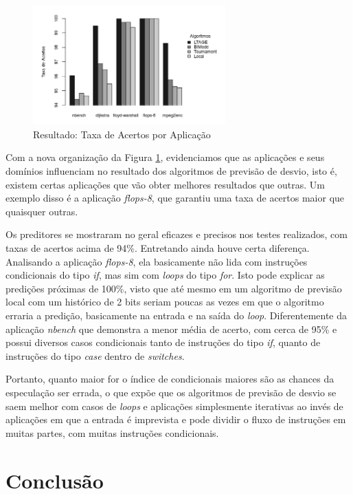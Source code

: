 \documentclass[12pt]{article}
\begin{document}
\begin{figure}[H]
\centering
\includegraphics[width=0.66\textwidth]{appTax.jpeg}
\caption{Resultado: Taxa de Acertos por Aplicação}
\label{fig:appTax}
\end{figure}

Com a nova organização da Figura \ref{fig:appTax}, evidenciamos que as aplicações e seus domínios influenciam no resultado dos algoritmos
de previsão de desvio, isto é, existem certas aplicações que vão obter melhores resultados que outras. Um exemplo disso é 
a aplicação \textit{flops-8}, que garantiu uma taxa de acertos maior que quaisquer outras.

Os preditores se mostraram no geral eficazes e precisos nos testes realizados, com taxas de acertos acima de 94\%. Entretando ainda houve 
certa diferença. Analisando a aplicação \textit{flops-8}, ela basicamente não lida com instruções condicionais do tipo \textit{if},
mas sim com \textit{loops} do tipo \textit{for}. Isto pode explicar as predições próximas de 100\%, visto que até mesmo em um algoritmo de 
previsão local com um histórico de 2 bits seriam poucas as vezes em que o algoritmo erraria a predição, basicamente na entrada 
e na saída do \textit{loop}. Diferentemente da aplicação \textit{nbench} que demonstra a menor média de acerto, com cerca de 95\% e possui 
diversos casos condicionais tanto de instruções do tipo \textit{if}, quanto de instruções do tipo \textit{case} dentro de \textit{switches}.

Portanto, quanto maior for o índice de condicionais maiores são as chances da especulação ser errada, o que expõe que os algoritmos
de previsão de desvio se saem melhor com casos de \textit{loops} e aplicações simplesmente iterativas ao invés de aplicações em que a entrada
é imprevista e pode dividir o fluxo de instruções em muitas partes, com muitas instruções condicionais.

\section{Conclusão}
\end{document}
